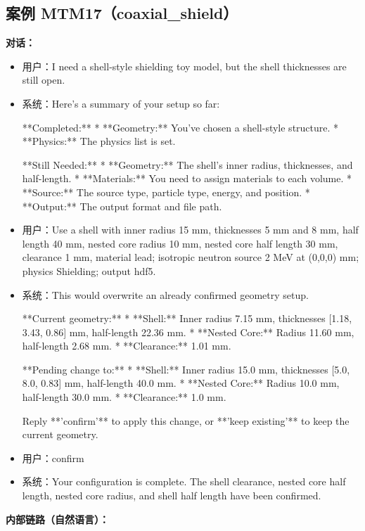 \documentclass[11pt]{ctexart}
\begin{document}
\subsection{案例 MTM17（coaxial\_shield）}
\textbf{对话：}
\begin{itemize}
\item 用户：I need a shell-style shielding toy model, but the shell thicknesses are still open.
\item 系统：Here's a summary of your setup so far:

**Completed:**
*   **Geometry:** You've chosen a shell-style structure.
*   **Physics:** The physics list is set.

**Still Needed:**
*   **Geometry:** The shell's inner radius, thicknesses, and half-length.
*   **Materials:** You need to assign materials to each volume.
*   **Source:** The source type, particle type, energy, and position.
*   **Output:** The output format and file path.
\item 用户：Use a shell with inner radius 15 mm, thicknesses 5 mm and 8 mm, half length 40 mm, nested core radius 10 mm, nested core half length 30 mm, clearance 1 mm, material lead; isotropic neutron source 2 MeV at (0,0,0) mm; physics Shielding; output hdf5.
\item 系统：This would overwrite an already confirmed geometry setup.

**Current geometry:**
*   **Shell:** Inner radius 7.15 mm, thicknesses [1.18, 3.43, 0.86] mm, half-length 22.36 mm.
*   **Nested Core:** Radius 11.60 mm, half-length 2.68 mm.
*   **Clearance:** 1.01 mm.

**Pending change to:**
*   **Shell:** Inner radius 15.0 mm, thicknesses [5.0, 8.0, 0.83] mm, half-length 40.0 mm.
*   **Nested Core:** Radius 10.0 mm, half-length 30.0 mm.
*   **Clearance:** 1.0 mm.

Reply **'confirm'** to apply this change, or **'keep existing'** to keep the current geometry.
\item 用户：confirm
\item 系统：Your configuration is complete. The shell clearance, nested core half length, nested core radius, and shell half length have been confirmed.
\end{itemize}
\textbf{内部链路（自然语言）：}
\end{document}
